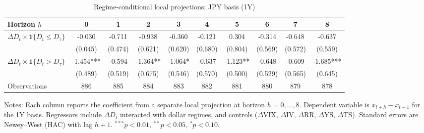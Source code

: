 \begin{table}[!htbp]\centering
\caption{Regime-conditional local projections: JPY basis (1Y)}
\label{tab:lp_jpy_1y}
\begin{tabular}{lccccccccc}
\toprule
Horizon $h$ & 0 & 1 & 2 & 3 & 4 & 5 & 6 & 7 & 8 \\
\midrule
$\Delta D_t \times \mathbf{1}\{D_t \le D_\tau\}$ & -0.030 & -0.711 & -0.938 & -0.360 & -0.121 & 0.304 & -0.314 & -0.648 & -0.637 \\
  & (0.045) & (0.474) & (0.621) & (0.620) & (0.680) & (0.804) & (0.569) & (0.572) & (0.559) \\
$\Delta D_t \times \mathbf{1}\{D_t > D_\tau\}$ & -1.454*** & -0.594 & -1.364** & -1.064* & -0.637 & -1.123** & -0.648 & -0.609 & -1.685*** \\
  & (0.489) & (0.519) & (0.675) & (0.546) & (0.570) & (0.500) & (0.529) & (0.565) & (0.645) \\
\midrule
Observations & 886 & 885 & 884 & 883 & 882 & 881 & 880 & 879 & 878 \\
\bottomrule
\end{tabular}
\begin{flushleft}\footnotesize Notes: Each column reports the coefficient from a separate local projection at horizon $h=0,\dots,8$. Dependent variable is $x_{t+h}-x_{t-1}$ for the 1Y basis. Regressors include $\Delta D_t$ interacted with dollar regimes, and controls ($\Delta$VIX, $\Delta$IV, $\Delta$RR, $\Delta$YS, $\Delta$TS). Standard errors are Newey--West (HAC) with lag $h+1$. $^{***}p<0.01$, $^{**}p<0.05$, $^{*}p<0.10$.\end{flushleft}
\end{table}